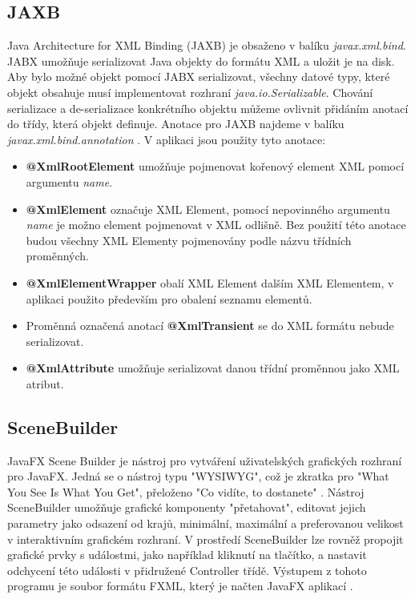 \documentclass[czech,bachelor,public,dept460,male,cpdeclaration,twoside]{diploma}
\begin{document}
\subsection{JAXB} \label{jabx}
Java Architecture for XML Binding (JAXB) je obsaženo v balíku \textit{javax.xml.bind}. JABX umožňuje serializovat Java objekty do formátu XML a uložit je na disk. Aby bylo možné objekt pomocí JABX serializovat, všechny datové typy, které objekt obsahuje musí implementovat rozhraní \textit{java.io.Serializable}. Chování serializace a de-serializace konkrétního objektu můžeme ovlivnit přidáním anotací do třídy, která objekt definuje. Anotace pro JAXB najdeme v balíku \textit{javax.xml.bind.annotation} \cite{jaxb}. V aplikaci jsou použity tyto anotace:
\begin{itemize}
  	\item \textbf{@XmlRootElement} umožňuje pojmenovat kořenový element XML pomocí argumentu \textit{name}.
  	\item \textbf{@XmlElement} označuje XML Element, pomocí nepovinného argumentu \textit{name} je možno element pojmenovat v XML odlišně. Bez použití této anotace budou všechny XML Elementy pojmenovány podle názvu třídních proměnných.
  	\item \textbf{@XmlElementWrapper} obalí XML Element dalším XML Elementem, v aplikaci použito především pro obalení seznamu elementů.
  	\item Proměnná označená anotací \textbf{@XmlTransient} se do XML formátu nebude serializovat.
  	\item \textbf{@XmlAttribute} umožňuje serializovat danou třídní proměnnou jako XML atribut.
\end{itemize}

\subsection{SceneBuilder}
JavaFX Scene Builder je nástroj pro vytváření uživatelských grafických rozhraní pro JavaFX. Jedná se o nástroj typu "WYSIWYG", což je zkratka pro "What You See Is What You Get", přeloženo "Co vidíte, to dostanete"  \cite{sceneb}. Nástroj SceneBuilder umožňuje grafické komponenty "přetahovat", editovat jejich parametry jako odsazení od krajů, minimální, maximální a preferovanou velikost v interaktivním grafickém rozhraní. V prostředí SceneBuilder lze rovněž propojit grafické prvky s událostmi, jako například kliknutí na tlačítko, a nastavit odchycení této události v přidružené Controller třídě. Výstupem z tohoto programu je soubor formátu FXML, který je načten JavaFX aplikací \cite{scenebuilder}.
\end{document}
